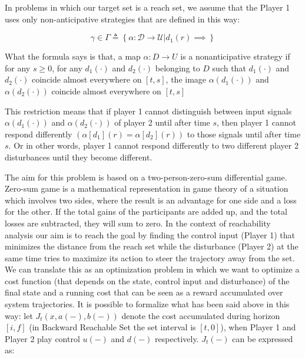 In problems in which our target set is a reach set, we assume that the Player 1 uses only non-anticipative strategies that are defined in this way:


\begin{equation}
	\gamma \in \Gamma \triangleq \left\{ \alpha : \mathcal{D} \rightarrow \mathcal{U} | d_1(r) \implies \right\}  
\end{equation}

What the formula says is that, a map $\alpha : D \rightarrow U$ is a nonanticipative strategy if  for any $s \geq 0$, for any $d_1(\cdot)$ and $d_2(\cdot)$ belonging to $D$ such that $d_1(\cdot)$ and $d_2(\cdot)$ coincide almost everywhere on $[t,s]$, the image $\alpha(d_1(\cdot))$ and $\alpha(d_2(\cdot))$ coincide almost everywhere on $[t,s]$

This restriction means that if player 1 cannot distinguish between input signals $ \alpha (d_1( \cdot )) $ and $ \alpha (d_2( \cdot ) )$ of player 2 until after time $s$, then player 1 cannot respond differently $( \alpha [d_1](r) = \alpha [ d_2 ](r))$ to those signals until after time $s$. Or in other words, player 1 cannot respond differently to two different player 2 disturbances until they become different.

The aim for this problem is based on a two-person-zero-sum differential game. Zero-sum game is a mathematical representation in game theory of a situation which involves two sides, where the result is an advantage for one side and a loss for the other. If the total gains of the participants are added up, and the total losses are subtracted, they will sum to zero.
In the context of reachability analysis our aim is to reach the goal by finding the control input (Player 1) that minimizes the distance from the reach set while the disturbance  (Player 2) at the same time tries to maximize its action to steer the trajectory away from the set. We can translate this as an optimization problem in which we want to optimize a cost function (that depends on the state, control input and disturbance) of the final state and a running cost that can be seen as a reward accumulated over system trajectories. 
It is possible to formalize what has been said above in this way: let $J_t(x,a(-),b(-))$ denote the cost accumulated during horizon $[i ,f ]$ (in Backward Reachable Set the set interval is $[t,0]$), when Player 1 and Player 2 play control $u(-)$ and $d(-)$ respectively. $J_t(-)$ can be expressed as:


